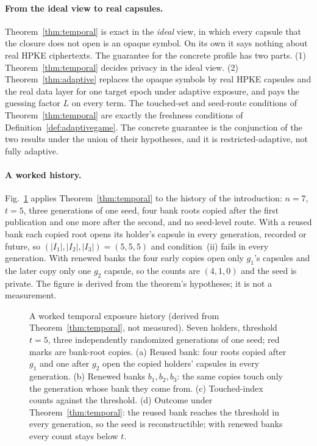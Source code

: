 \documentclass[pdflatex,sn-mathphys-num,twocolumn]{sn-jnl}
\theoremstyle{plain}
\theoremstyle{definition}
\begin{document}
\paragraph{From the ideal view to real capsules.}
Theorem~\ref{thm:temporal} is exact in the \emph{ideal} view, in which every capsule that the closure does not open is an opaque symbol. On its own it says nothing about real HPKE ciphertexts. The guarantee for the concrete profile has two parts. (1) Theorem~\ref{thm:temporal} decides privacy in the ideal view. (2) Theorem~\ref{thm:adaptive} replaces the opaque symbols by real HPKE capsules and the real data layer for one target epoch under adaptive exposure, and pays the guessing factor $L$ on every term. The touched-set and seed-route conditions of Theorem~\ref{thm:temporal} are exactly the freshness conditions of Definition~\ref{def:adaptivegame}. The concrete guarantee is the conjunction of the two results under the union of their hypotheses, and it is restricted-adaptive, not fully adaptive.

\paragraph{A worked history.}
Fig.~\ref{fig:worked} applies Theorem~\ref{thm:temporal} to the history of the introduction: $n=7$, $t=5$, three generations of one seed, four bank roots copied after the first publication and one more after the second, and no seed-level route. With a reused bank each copied root opens its holder's capsule in every generation, recorded or future, so $(|I_1|,|I_2|,|I_3|)=(5,5,5)$ and condition~(ii) fails in every generation. With renewed banks the four early copies open only $g_1$'s capsules and the later copy only one $g_2$ capsule, so the counts are $(4,1,0)$ and the seed is private. The figure is derived from the theorem's hypotheses; it is not a measurement.

\begin{figure}[t]
\centering
\resizebox{\linewidth}{!}{}
\caption{A worked temporal exposure history (derived from Theorem~\ref{thm:temporal}, not measured). Seven holders, threshold $t=5$, three independently randomized generations of one seed; red marks are bank-root copies. (a) Reused bank: four roots copied after $g_1$ and one after $g_2$ open the copied holders' capsules in every generation. (b) Renewed banks $b_1,b_2,b_3$: the same copies touch only the generation whose bank they come from. (c) Touched-index counts against the threshold. (d) Outcome under Theorem~\ref{thm:temporal}: the reused bank reaches the threshold in every generation, so the seed is reconstructible; with renewed banks every count stays below $t$.}\label{fig:worked}
\end{figure}
\end{document}
